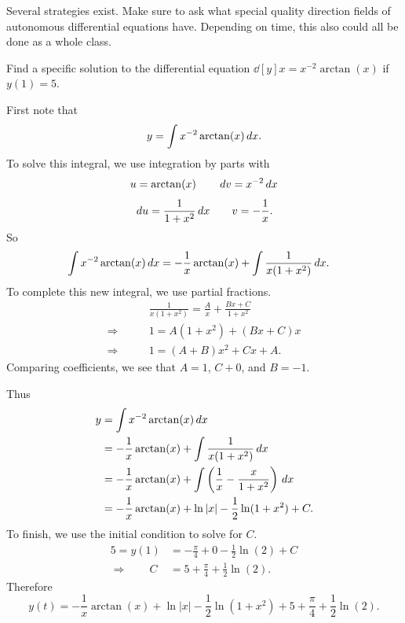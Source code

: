 \documentclass[noinstructornotes]{ximera}
\begin{document}
\begin{instructorNotes}
Several strategies exist.  
Make sure to ask what special quality direction fields of autonomous differential equations have.  
Depending on time, this also could all be done as a whole class.
\end{instructorNotes}











\begin{problem}
Find a specific solution to the differential equation $\dd[y]{x} = x^{-2} \arctan(x)$ if $y(1)=5$.
	\begin{freeResponse}
	First note that
		\[
		y = \int x^{-2} \arctan(x) \,d x.
		\]
	To solve this integral, we use integration by parts with
		{\color{red}
		\[
		u = \arctan(x)  			\qquad 	\,d v = x^{-2} \,d x
		\]
		\[
		\,d u = \frac{1}{1+x^2} \,d x  \qquad 	v = -\frac{1}{x}.
		\]
		}
	So
		\begin{align*}
		\int x^{-2} \arctan(x) \,d x
		&= - \frac{1}{x} \arctan(x) + \int \frac{1}{x(1+x^2)} \,d x.
		\end{align*}
	To complete this new integral, we use partial fractions.
		{\color{red}
		\begin{align*}
		&\frac{1}{x(1+x^2)} = \frac{A}{x} + \frac{Bx+C}{1+x^2}  \\
		\Longrightarrow \qquad &1 = A(1+x^2) + (Bx+C)x  \\
		\Longrightarrow \qquad &1 = (A+B)x^2 + Cx + A.
		\end{align*}
	Comparing coefficients, we see that $A=1$, $C+0$, and $B = -1$.  
		}
		
	Thus
		\begin{align*}
		y &= \int x^{-2} \arctan(x) \,d x  \\
		&= - \frac{1}{x} \arctan(x) + \int \frac{1}{x(1+x^2)} \,d x  \\
		&= - \frac{1}{x} \arctan(x) + \int \left( \frac{1}{x} - \frac{x}{1+x^2} \right) \,d x  \\
		&= - \frac{1}{x} \arctan(x) + \ln|x| - \frac{1}{2} \ln(1+x^2) + C.
		\end{align*}
	To finish, we use the initial condition to solve for $C$.
		\begin{align*}
		5 = y(1) &= - \frac{\pi}{4} + 0 - \frac{1}{2} \ln(2) + C  \\
		\Longrightarrow \qquad C &= 5 + \frac{\pi}{4} + \frac{1}{2} \ln(2).
		\end{align*}
	Therefore
		\[
		y(t) = - \frac{1}{x} \arctan(x) + \ln|x| - \frac{1}{2} \ln(1+x^2) + 5 + \frac{\pi}{4} + \frac{1}{2} \ln(2).
		\]
	\end{freeResponse}

\end{problem}
\end{document}
